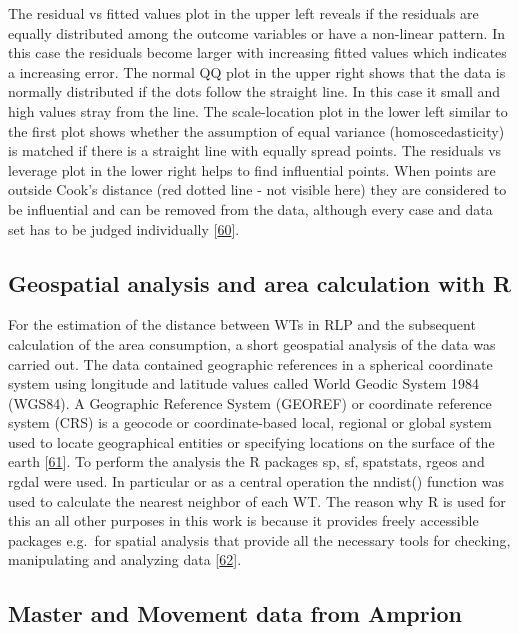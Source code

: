 \documentclass[a4paper,11pt]{article}
\begin{document}
The residual vs fitted values plot in the upper left reveals if the residuals are equally distributed among the outcome variables or have a non-linear pattern. In this case the residuals become larger with increasing fitted values which indicates a increasing error. The normal QQ plot in the upper right shows that the data is normally distributed if the dots follow the straight line. In this case it small and high values stray from the line. The scale-location plot in the lower left similar to the first plot shows whether the assumption of equal variance (homoscedasticity) is matched if there is a straight line with equally spread points. The residuals vs leverage plot in the lower right helps to find influential points. When points are outside Cook's distance (red dotted line - not visible here) they are considered to be influential and can be removed from the data, although every case and data set has to be judged individually {[}\protect\hyperlink{ref-BommaeKim.2015}{60}{]}.

\hypertarget{geospatial-analysis-and-area-calculation-with-r}{%
\subsection{Geospatial analysis and area calculation with R}\label{geospatial-analysis-and-area-calculation-with-r}}

For the estimation of the distance between WTs in RLP and the subsequent calculation of the area consumption, a short geospatial analysis of the data was carried out. The data contained geographic references in a spherical coordinate system using longitude and latitude values called World Geodic System 1984 (WGS84). A Geographic Reference System (GEOREF) or coordinate reference system (CRS) is a geocode or coordinate-based local, regional or global system used to locate geographical entities or specifying locations on the surface of the earth {[}\protect\hyperlink{ref-ISO.2007}{61}{]}. To perform the analysis the R packages sp, sf, spatstats, rgeos and rgdal were used. In particular or as a central operation the nndist() function was used to calculate the nearest neighbor of each WT. The reason why R is used for this an all other purposes in this work is because it provides freely accessible packages e.g.~for spatial analysis that provide all the necessary tools for checking, manipulating and analyzing data {[}\protect\hyperlink{ref-RogerS.Bivan.2008}{62}{]}.

\hypertarget{master-and-movement-data-from-amprion}{%
\subsection{Master and Movement data from Amprion}\label{master-and-movement-data-from-amprion}}
\end{document}
